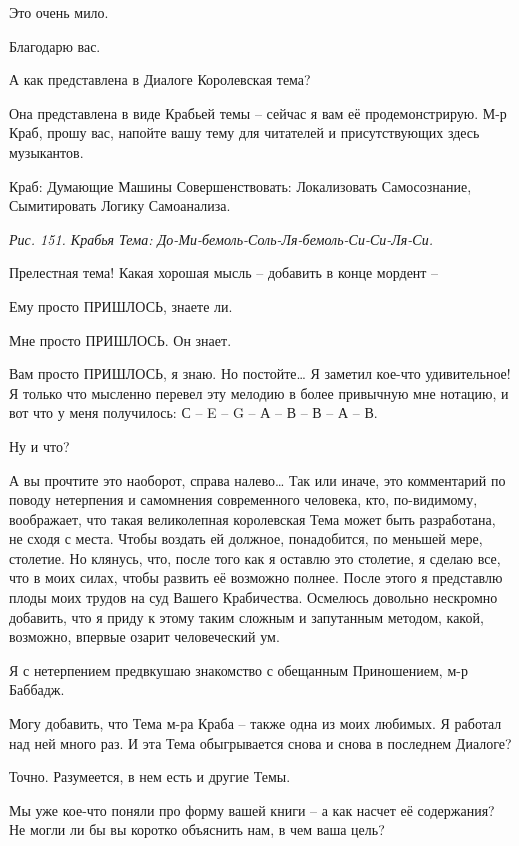 \documentclass[../main.tex]{subfiles}
\begin{document}
\begin{dialogue}
 Это очень мило.

 Благодарю вас.

 А как представлена в Диалоге Королевская тема?

 Она представлена в виде Крабьей темы \--- сейчас я вам её продемонстрирую. М-р Краб, прошу вас, напойте вашу тему для читателей и присутствующих здесь музыкантов.

Краб: Думающие Машины Совершенствовать: Локализовать Самосознание, Сымитировать Логику Самоанализа.

\emph{Рис. 151. Крабья Тема: До-Ми-бемоль-Соль-Ля-бемоль-Си-Си-Ля-Си.}

 Прелестная тема! Какая хорошая мысль \--- добавить в конце мордент \---

 Ему просто ПРИШЛОСЬ, знаете ли.

 Мне просто ПРИШЛОСЬ. Он знает.

 Вам просто ПРИШЛОСЬ, я знаю. Но постойте\ldots{} Я заметил кое-что удивительное! Я только что мысленно перевел эту мелодию в более привычную мне нотацию, и вот что у меня получилось: С \--- E \--- G \--- А \--- В \--- В \--- А \--- В.

 Ну и что?

 А вы прочтите это наоборот, справа налево\ldots{} Так или иначе, это комментарий по поводу нетерпения и самомнения современного человека, кто, по-видимому, воображает, что такая великолепная королевская Тема может быть разработана, не сходя с места. Чтобы воздать ей должное, понадобится, по меньшей мере, столетие. Но клянусь, что, после того как я оставлю это столетие, я сделаю все, что в моих силах, чтобы развить её возможно полнее. После этого я представлю плоды моих трудов на суд Вашего Крабичества. Осмелюсь довольно нескромно добавить, что я приду к этому таким сложным и запутанным методом, какой, возможно, впервые озарит человеческий ум.

 Я с нетерпением предвкушаю знакомство с обещанным Приношением, м-р Баббадж.

 Могу добавить, что Тема м-ра Краба \--- также одна из моих любимых. Я работал над ней много раз. И эта Тема обыгрывается снова и снова в последнем Диалоге?

 Точно. Разумеется, в нем есть и другие Темы.

 Мы уже кое-что поняли про форму вашей книги \--- а как насчет её содержания? Не могли ли бы вы коротко объяснить нам, в чем ваша цель?


\end{dialogue}
\end{document}
